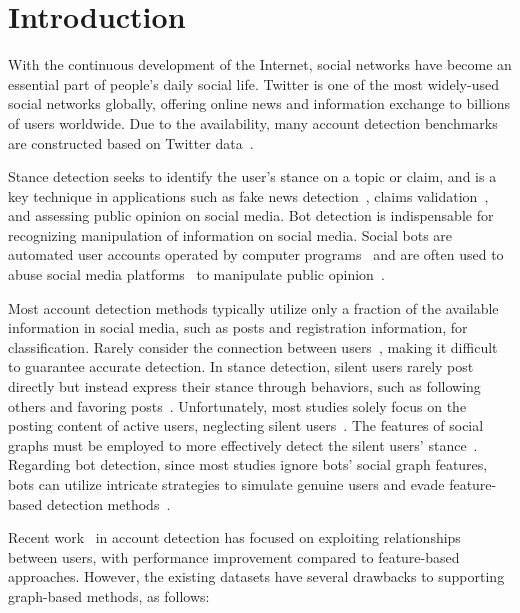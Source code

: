 \documentclass[10pt,twocolumn,letterpaper]{article}
\begin{document}
\section{Introduction}

\label{sec:intro}
With the continuous development of the Internet, social networks have become an essential part of people's daily social life. Twitter is one of the most widely-used social networks globally, offering online news and information exchange to billions of users worldwide. Due to the availability, many account detection benchmarks are constructed based on Twitter data~\cite{Alpher10,Alpher11,Alpher12,Alpher21}.


Stance detection seeks to identify the user's stance on a topic or claim, and is a key technique in applications such as fake news detection~\cite{Alpher25,Alpher27}, claims validation~\cite{Alpher09,Alpher30}, and assessing public opinion on social media. Bot detection is indispensable for recognizing manipulation of information on social media. Social bots are automated user accounts operated by computer programs~\cite{Alpher35} and are often used to abuse social media platforms~\cite{Alpher04,Alpher05} to manipulate public opinion~\cite{Alpher04,Alpher07,Alpher10,Alpher35}.


Most account detection methods typically utilize only a fraction of the available information in social media, such as posts and registration information, for classification. Rarely consider the connection between users~\cite{Alpher08}, making it difficult to guarantee accurate detection. In stance detection, silent users rarely post directly but instead express their stance through behaviors, such as following others and favoring posts~\cite{Alpher08}. Unfortunately, most studies solely focus on the posting content of active users, neglecting silent users~\cite{Alpher08}. The features of social graphs must be employed to more effectively detect the silent users' stance~\cite{Alpher09}. Regarding bot detection, since most studies ignore bots' social graph features, bots can utilize intricate strategies to simulate genuine users and evade feature-based detection methods~\cite{Alpher04}.


Recent work~\cite{Alpher06,Alpher24,Alpher44} in account detection has focused on exploiting relationships between users, with performance improvement compared to feature-based approaches. However, the existing datasets have several drawbacks to supporting graph-based methods, as follows:
\end{document}
